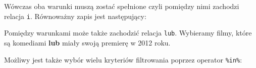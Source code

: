 \documentclass[]{book}
\newenvironment{Shaded}{\begin{snugshade}}{\end{snugshade}}
\newcommand{\KeywordTok}[1]{\textcolor[rgb]{0.13,0.29,0.53}{\textbf{#1}}}
\newcommand{\DecValTok}[1]{\textcolor[rgb]{0.00,0.00,0.81}{#1}}
\newcommand{\StringTok}[1]{\textcolor[rgb]{0.31,0.60,0.02}{#1}}
\newcommand{\OperatorTok}[1]{\textcolor[rgb]{0.81,0.36,0.00}{\textbf{#1}}}
\newcommand{\NormalTok}[1]{#1}
\begin{document}
\begin{Shaded}
\end{Shaded}

Wówczas oba warunki muszą zostać spełnione czyli pomiędzy nimi zachodzi
relacja \texttt{i}. Równoważny zapis jest następujący:

\begin{Shaded}
\end{Shaded}

Pomiędzy warunkami może także zachodzić relacja \texttt{lub}. Wybieramy
filmy, które są komediami \textbf{lub} miały swoją premierę w 2012 roku.

\begin{Shaded}
\end{Shaded}

Możliwy jest także wybór wielu kryteriów filtrowania poprzez operator
\texttt{\%in\%}:

\begin{Shaded}
\end{Shaded}
\end{document}
